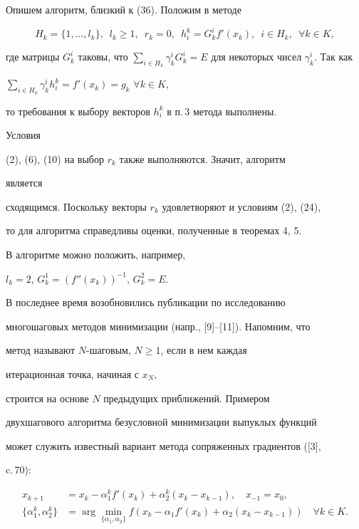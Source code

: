 Опишем алгоритм, близкий к (36). Положим в методе


$$


H_k=\{1,\dotsc,l_k\},\ \; l_k\geq 1,\ \; r_k=0,\ \;


h^k_i=G^i_k{f}'(x_k),\ \; i\in H_k,\ \; \forall k\in K,


$$


где матрицы $G^i_k$ таковы, что $\sum\limits_{i\in H_k}\gamma^i_k


G^i_k=E$ для некоторых чисел $\gamma^i_k$. Так как 


$\sum\limits_{i\in H_k}\gamma^i_k h^k_i=f'(x_k)=g_k$ $\forall k\in K$,


то требования к выбору векторов $h^k_i$ в п.\,3 метода выполнены. 


Условия


(2), (6), (10) на выбор $r_k$ также выполняются. Значит, алгоритм 


является 


сходящимся. Поскольку векторы $r_k$ удовлетворяют и условиям (2), (24),


то для алгоритма справедливы оценки, полученные в теоремах 4, 5.


В алгоритме можно положить, например,


$l_k=2$, $G^1_k=({f}''(x_k))^{-1}$, $G^2_k=E$.





В последнее время возобновились публикации по исследованию 


многошаговых методов минимизации (напр., [9]--[11]). Напомним, что 


метод называют $N$-шаговым, $N\geq 1$, если в нем каждая 


итерационная точка, начиная с $x_N$, 


строится на основе $N$ предыдущих приближений. Примером 


двухшагового алгоритма безусловной минимизации выпуклых функций 


может служить известный вариант метода сопряженных градиентов ([3], 


c.\,70): 


\begin{equation}


\begin{split}


x_{k+1}&=x_k-\alpha^k_1{f}'(x_k)+\alpha^k_2(x_k-x_{k-1}),\quad x_{-1}=x_0,\\


\{\alpha^k_1,\alpha^k_2\} &=


\arg \min_{\{\alpha_1,\alpha_2\}}f(x_k-\alpha_1{f}'(x_k)+


\alpha_2(x_k-x_{k-1}))\quad \forall k\in K.


\end{split}


\end{equation}





